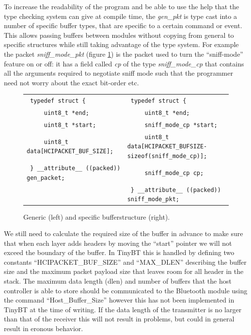 \documentclass[a4paper,10pt]{article}
\begin{document}
To increase the readability of the program and be able to use the help
that the type checking system can give at compile time, the
\emph{gen\_pkt} is type cast into a number of specific buffer types,
that are specific to a certain command or event.  This allows passing
buffers between modules without copying from general to specific
structures while still taking advantage of the type system. For
example the packet \emph{sniff\_mode\_pkt} (figure \ref{fig:buffer})
is the packet used to turn the ``sniff-mode'' feature on or off: it
has a field called \emph{cp} of the type \emph{sniff\_mode\_cp} that
contains all the arguments required to negotiate sniff mode such that
the programmer need not worry about the exact bit-order etc.

\begin{figure}[tbp]
  \centering
\begin{scriptsize}
\begin{tabular}{ll}
\verb+ typedef struct {+  &          \verb+ typedef struct {+ \\
\verb+     uint8_t *end;+         & \verb+     uint8_t *end;+\\
\verb+     uint8_t *start;+       & \verb+     sniff_mode_cp *start;+\\
\verb+     uint8_t data[HCIPACKET_BUF_SIZE];+ & 
\verb+     uint8_t data[HCIPACKET_BUFSIZE-sizeof(sniff_mode_cp)];+\\
\verb+ } __attribute__ ((packed)) gen_packet;+ &  \verb+     sniff_mode_cp cp;+ \\
                     &    \verb+ } __attribute__ ((packed)) sniff_mode_pkt;+ 
\end{tabular}
\end{scriptsize}
  \caption{Generic (left) and specific bufferstructure (right).}
  \label{fig:buffer}
\end{figure}

We still need to calculate the required size of the buffer in advance
to make sure that when each layer adds headers by moving the ``start''
pointer we will not exceed the boundary of the buffer. In TinyBT this
is handled by defining two constants ``HCIPACKET\_BUF\_SIZE'' and
``MAX\_DLEN'' describing the buffer size and the maximum packet payload
size that leaves room for all header in the stack. The maximum data
length (dlen) and number of buffers that the host controller is able
to store should be communicated to the Bluetooth module using the
command ``Host\_Buffer\_Size''\cite{BT02, 4.7.41} however this has not
been implemented in TinyBT at the time of writing. If the data length
of the transmitter is no larger than that of the receiver this will
not result in problems, but could in general result in eronous
behavior.
\end{document}
